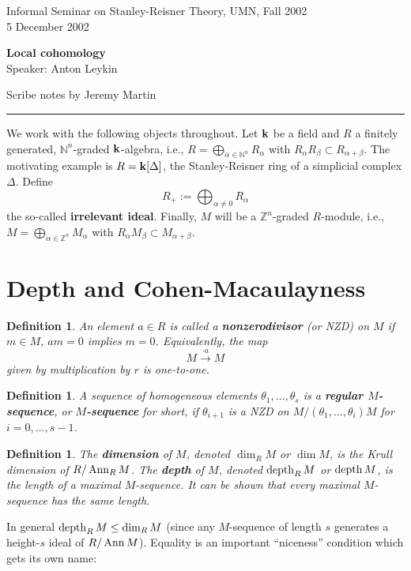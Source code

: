 \documentclass{amsart}
\newtheorem{defn}[thm]{Definition}
\newcommand{\0}{\emptyset}
\newcommand{\depth}{\mathop{\rm depth}\nolimits}
\newcommand{\Ann}{\mathop{\rm Ann}\nolimits}
\newcommand{\fld}{{\bf k}}
\newcommand{\NN}{{\mathbb N}}
\newcommand{\ZZ}{{\mathbb Z}}
\newcommand{\defterm}[1] {{\bf #1}}
\begin{document}
Informal Seminar on Stanley-Reisner Theory, UMN, Fall 2002 \\
5 December 2002

{\bf Local cohomology} \\
Speaker: Anton Leykin

Scribe notes by Jeremy Martin \\

\hrule

We work with the following objects throughout.  Let $\fld$ be a field and $R$ a finitely
generated, $\NN^n$-graded $\fld$-algebra, i.e., $R = \bigoplus_{\alpha \in \NN^n} R_\alpha$
with $R_\alpha R_\beta \subset R_{\alpha+\beta}$.  The motivating example is $R = 
\fld[\Delta]$, the Stanley-Reisner ring of a simplicial complex $\Delta$.  Define
	$$R_+ := \bigoplus_{\alpha \neq 0} R_\alpha$$
the so-called \defterm{irrelevant ideal}.  Finally, $M$ will be a $\ZZ^n$-graded $R$-module, 
i.e., $M = \bigoplus_{\alpha \in \ZZ^n} M_\alpha$ with $R_\alpha M_\beta \subset 
M_{\alpha+\beta}$.

\section{Depth and Cohen-Macaulayness}

\begin{defn} An element $a \in R$ is called a \defterm{nonzerodivisor} (or NZD) on $M$ if $m 
\in M$, $am=0$ implies $m=0$.  Equivalently, the map
	$$M \xrightarrow{\cdot a} M$$
given by multiplication by $r$ is one-to-one.
\end{defn}

\begin{defn}
A sequence of homogeneous elements $\theta_1, \dots, \theta_s$ is a \defterm{regular
$M$-sequence}, or \defterm{$M$-sequence} for short, if $\theta_{i+1}$ is a NZD
on $M/(\theta_1, \dots, \theta_i)M$ for $i=0, \dots, s-1$.
\end{defn}

\begin{defn}
The \defterm{dimension} of $M$, denoted $\dim_R M$ or $\dim M$, is the Krull dimension of 
$R/\Ann_R M$.  The \defterm{depth} of $M$, denoted $\depth_R M$ or $\depth M$, is the length 
of a maximal $M$-sequence.  It can be shown that every maximal $M$-sequence has the same
length.
\end{defn}

In general $\depth_R M \leq \dim_R M$ (since any $M$-sequence of length $s$ generates a 
height-$s$ ideal of $R/\Ann M$).  Equality is an important ``niceness'' condition which gets 
its own name:
\end{document}
